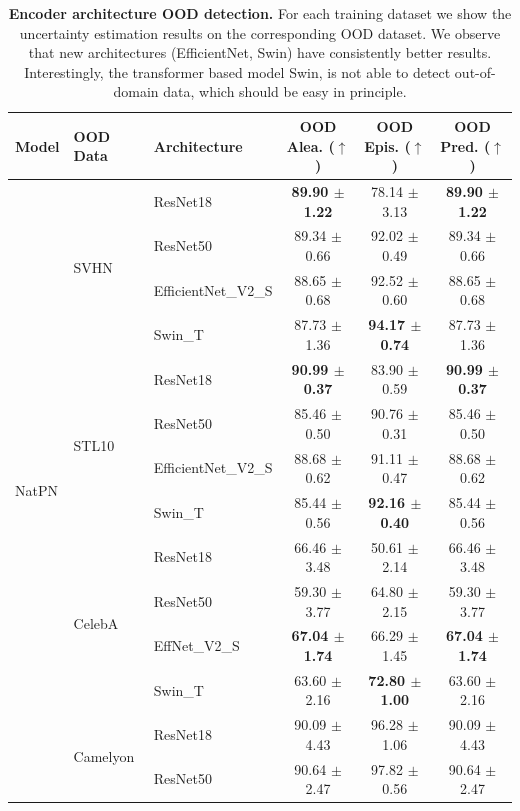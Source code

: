 \begin{table}[!htb]
\centering
\caption{\textbf{Encoder architecture OOD detection.} For each training dataset we show the uncertainty estimation results on the corresponding OOD dataset. We observe that new architectures (EfficientNet, Swin) have consistently better results. Interestingly, the transformer based model Swin, is not able to detect out-of-domain data, which should be easy in principle.}
\label{tab:encoder_architecture_ood}
\tiny
\begin{tabular}{lllccc}
    \toprule
    \textbf{Model} &\textbf{OOD Data} &\textbf{Architecture} &\textbf{OOD Alea. ($\uparrow$)} &\textbf{OOD Epis. ($\uparrow$)} &\textbf{OOD Pred. ($\uparrow$)} \\
    \midrule
    \multirow{20}{*}{NatPN} &\multirow{4}{*}{SVHN} &ResNet18 &\textbf{89.90 $\pm$ 1.22} &78.14 $\pm$ 3.13 &\textbf{89.90 $\pm$ 1.22} \\
    & &ResNet50 &89.34 $\pm$ 0.66 &92.02 $\pm$ 0.49 &89.34 $\pm$ 0.66 \\
    & &EfficientNet\_V2\_S &88.65 $\pm$ 0.68 &92.52 $\pm$ 0.60 &88.65 $\pm$ 0.68 \\
    & &Swin\_T &87.73 $\pm$ 1.36 &\textbf{94.17 $\pm$ 0.74} &87.73 $\pm$ 1.36 \\
    \cmidrule[0.1pt](lr){2-6}
    &\multirow{4}{*}{STL10} &ResNet18 &\textbf{90.99 $\pm$ 0.37} &83.90 $\pm$ 0.59 &\textbf{90.99 $\pm$ 0.37} \\
    & &ResNet50 &85.46 $\pm$ 0.50 &90.76 $\pm$ 0.31 &85.46 $\pm$ 0.50 \\
    & &EfficientNet\_V2\_S &88.68 $\pm$ 0.62 &91.11 $\pm$ 0.47 &88.68 $\pm$ 0.62 \\
    & &Swin\_T &85.44 $\pm$ 0.56 &\textbf{92.16 $\pm$ 0.40} &85.44 $\pm$ 0.56 \\
    \cmidrule[0.1pt](lr){2-6}
    &\multirow{4}{*}{CelebA} &ResNet18 &66.46 $\pm$ 3.48 &50.61 $\pm$ 2.14 &66.46 $\pm$ 3.48 \\
    & &ResNet50 &59.30 $\pm$ 3.77 &64.80 $\pm$ 2.15 &59.30 $\pm$ 3.77 \\
    & &EffNet\_V2\_S &\textbf{67.04 $\pm$ 1.74} &66.29 $\pm$ 1.45 &\textbf{67.04 $\pm$ 1.74} \\
    & &Swin\_T &63.60 $\pm$ 2.16 &\textbf{72.80 $\pm$ 1.00} &63.60 $\pm$ 2.16 \\
    \cmidrule[0.1pt](lr){2-6}
    &\multirow{4}{*}{Camelyon} &ResNet18 &90.09 $\pm$ 4.43 &96.28 $\pm$ 1.06 &90.09 $\pm$ 4.43 \\
    & &ResNet50 &90.64 $\pm$ 2.47 &97.82 $\pm$ 0.56 &90.64 $\pm$ 2.47 \\

\end{tabular}
\end{table}
